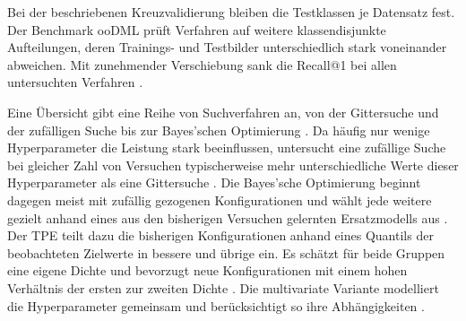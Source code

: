 Bei der beschriebenen Kreuzvalidierung bleiben die Testklassen je Datensatz fest. Der Benchmark ooDML prüft Verfahren auf weitere klassendisjunkte Aufteilungen, deren Trainings- und Testbilder unterschiedlich stark voneinander abweichen. Mit zunehmender Verschiebung sank die Recall@1 bei allen untersuchten Verfahren \cite{milbich_characterizing_2021}.

Eine Übersicht gibt eine Reihe von Suchverfahren an, von der Gittersuche und der zufälligen Suche bis zur Bayes'schen Optimierung \cite{bischl_hyperparameter_2023}. Da häufig nur wenige Hyperparameter die Leistung stark beeinflussen, untersucht eine zufällige Suche bei gleicher Zahl von Versuchen typischerweise mehr unterschiedliche Werte dieser Hyperparameter als eine Gittersuche \cite{bergstra_random_2012}. Die Bayes'sche Optimierung beginnt dagegen meist mit zufällig gezogenen Konfigurationen und wählt jede weitere gezielt anhand eines aus den bisherigen Versuchen gelernten Ersatzmodells aus \cite{bischl_hyperparameter_2023}. Der \ac{TPE} teilt dazu die bisherigen Konfigurationen anhand eines Quantils der beobachteten Zielwerte in bessere und übrige ein. Es schätzt für beide Gruppen eine eigene Dichte und bevorzugt neue Konfigurationen mit einem hohen Verhältnis der ersten zur zweiten Dichte \cite{bergstra_algorithms_2011}. Die multivariate Variante modelliert die Hyperparameter gemeinsam und berücksichtigt so ihre Abhängigkeiten \cite{watanabe_tree-structured_2023}.
